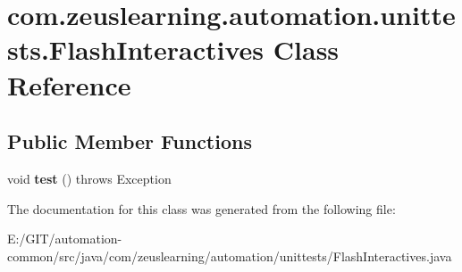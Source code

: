 \hypertarget{classcom_1_1zeuslearning_1_1automation_1_1unittests_1_1FlashInteractives}{}\section{com.\+zeuslearning.\+automation.\+unittests.\+Flash\+Interactives Class Reference}
\label{classcom_1_1zeuslearning_1_1automation_1_1unittests_1_1FlashInteractives}
\subsection*{Public Member Functions}
\begin{DoxyCompactItemize}
\item 
\hypertarget{classcom_1_1zeuslearning_1_1automation_1_1unittests_1_1FlashInteractives_adc588b336b9bea0105e2a0216a56dc09}{}\label{classcom_1_1zeuslearning_1_1automation_1_1unittests_1_1FlashInteractives_adc588b336b9bea0105e2a0216a56dc09} 
void {\bfseries test} ()  throws Exception 
\end{DoxyCompactItemize}


The documentation for this class was generated from the following file\+:\begin{DoxyCompactItemize}
\item 
E\+:/\+G\+I\+T/automation-\/common/src/java/com/zeuslearning/automation/unittests/Flash\+Interactives.\+java\end{DoxyCompactItemize}
